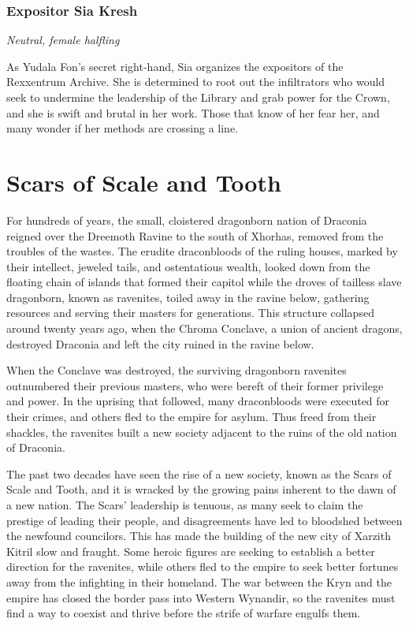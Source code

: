 \documentclass[10pt,a4paper,twoside,bg=print,twocolumn,openany,nodeprecatedcode]{dndbook}
\begin{document}
\subsubsection{Expositor Sia Kresh}
\textit{Neutral, female halfling}

As Yudala Fon's secret right-hand, Sia organizes the expositors of the Rexxentrum Archive. She is determined to root out the infiltrators who would seek to undermine the leadership of the Library and grab power for the Crown, and she is swift and brutal in her work. Those that know of her fear her, and many wonder if her methods are crossing a line.

\section{Scars of Scale and Tooth}
For hundreds of years, the small, cloistered dragonborn nation of Draconia reigned over the Dreemoth Ravine to the south of Xhorhas, removed from the troubles of the wastes. The erudite draconbloods of the ruling houses, marked by their intellect, jeweled tails, and ostentatious wealth, looked down from the floating chain of islands that formed their capitol while the droves of tailless slave dragonborn, known as ravenites, toiled away in the ravine below, gathering resources and serving their masters for generations. This structure collapsed around twenty years ago, when the Chroma Conclave, a union of ancient dragons, destroyed Draconia and left the city ruined in the ravine below.

When the Conclave was destroyed, the surviving dragonborn ravenites outnumbered their previous masters, who were bereft of their former privilege and power. In the uprising that followed, many draconbloods were executed for their crimes, and others fled to the empire for asylum. Thus freed from their shackles, the ravenites built a new society adjacent to the ruins of the old nation of Draconia.

The past two decades have seen the rise of a new society, known as the Scars of Scale and Tooth, and it is wracked by the growing pains inherent to the dawn of a new nation. The Scars' leadership is tenuous, as many seek to claim the prestige of leading their people, and disagreements have led to bloodshed between the newfound councilors. This has made the building of the new city of Xarzith Kitril slow and fraught. Some heroic figures are seeking to establish a better direction for the ravenites, while others fled to the empire to seek better fortunes away from the infighting in their homeland. The war between the Kryn and the empire has closed the border pass into Western Wynandir, so the ravenites must find a way to coexist and thrive before the strife of warfare engulfs them.
\end{document}
